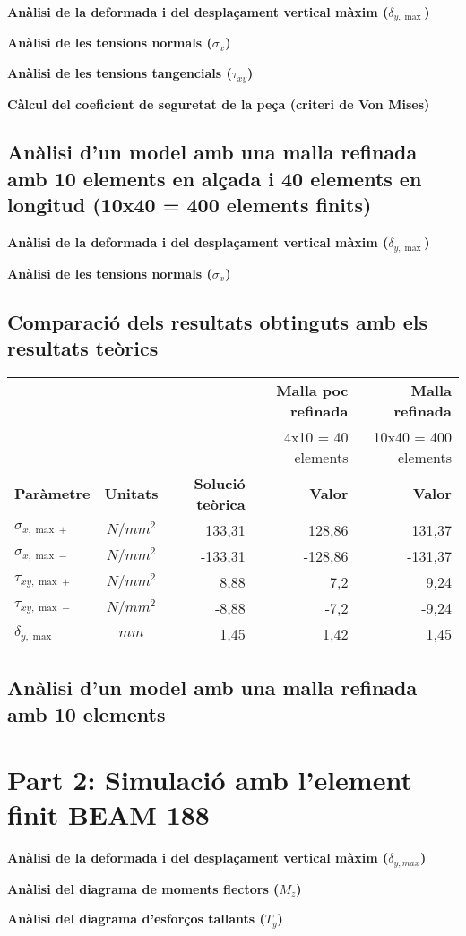 \documentclass[a4paper]{article}
\begin{document}
\textbf{Anàlisi de la deformada i del desplaçament vertical màxim ($\delta_{y, \max}$)}

\textbf{Anàlisi de les tensions normals ($\sigma_x$)}

\textbf{Anàlisi de les tensions tangencials ($\tau_{xy}$)}

\textbf{Càlcul del coeficient de seguretat de la peça (criteri de Von Mises)}

\subsection{Anàlisi d'un model amb una malla refinada amb 10 elements en alçada i 40 elements en longitud (10x40 = 400 elements finits)}
\textbf{Anàlisi de la deformada i del desplaçament vertical màxim ($\delta_{y,\max}$)}

\textbf{Anàlisi de les tensions normals ($\sigma_x$)}

\subsection{Comparació dels resultats obtinguts amb els resultats teòrics}

\begin{table}[H]
	\centering
	\begin{tabular}{|l|c|r|r|r|}
		\cline{4-5}
		\multicolumn{3}{c|}{\multirow{2}{*}{}} & \textbf{Malla poc refinada} & \textbf{Malla refinada} \\
		\multicolumn{3}{c|}{} & 4x10 = 40 elements & 10x40 = 400 elements \\
		\hline
		\textbf{Paràmetre} & \textbf{Unitats} & \textbf{Solució teòrica} & \textbf{Valor} & \textbf{Valor} \\
		\hline
		$\sigma_{x,\max+}$ & $N/mm^2$ & 133,31 & 128,86 & 131,37 \\
		$\sigma_{x,\max-}$ & $N/mm^2$ & -133,31 & -128,86 & -131,37 \\
		$\tau_{xy,\max+}$ & $N/mm^2$ & 8,88 & 7,2 & 9,24 \\
		$\tau_{xy,\max-}$ & $N/mm^2$ & -8,88 & -7,2 & -9,24 \\
		$\delta_{y,\max}$ & $mm$ & 1,45 & 1,42 & 1,45 \\
		\hline
	\end{tabular}
\end{table}



\subsection{Anàlisi d'un model amb una malla refinada amb 10 elements }

\section{Part 2: Simulació amb l'element finit BEAM 188}
\textbf{Anàlisi de la deformada i del desplaçament vertical màxim ($\delta_{y,max}$)}

\textbf{Anàlisi del diagrama de moments flectors ($M_z$)}

\textbf{Anàlisi del diagrama d'esforços tallants ($T_y$)}
\end{document}

